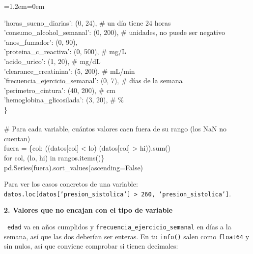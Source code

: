 \documentclass[11pt,a4paper]{article}
\newenvironment{codigo}
  {\par\smallskip\begin{list}{}{\leftmargin=1.2em\rightmargin=0em}\item\relax\ttfamily\scriptsize\raggedright}
  {\end{list}\smallskip}
\begin{document}
{\begin{codigo}
\hspace*{2.08em}'horas\_\allowbreak{}sueno\_\allowbreak{}diarias': (0, 24),        \# un día tiene 24 horas \\{}
\hspace*{2.08em}'consumo\_\allowbreak{}alcohol\_\allowbreak{}semanal': (0, 200),   \# unidades, no puede ser negativo \\{}
\hspace*{2.08em}'anos\_\allowbreak{}fumador': (0, 90), \\{}
\hspace*{2.08em}'proteina\_\allowbreak{}c\_\allowbreak{}reactiva': (0, 500),       \# mg/\allowbreak{}L \\{}
\hspace*{2.08em}'acido\_\allowbreak{}urico': (1, 20),                \# mg/\allowbreak{}dL \\{}
\hspace*{2.08em}'clearance\_\allowbreak{}creatinina': (5, 200),      \# mL/\allowbreak{}min \\{}
\hspace*{2.08em}'frecuencia\_\allowbreak{}ejercicio\_\allowbreak{}semanal': (0, 7),   \# días de la semana \\{}
\hspace*{2.08em}'perimetro\_\allowbreak{}cintura': (40, 200),        \# cm \\{}
\hspace*{2.08em}'hemoglobina\_\allowbreak{}glicosilada': (3, 20),    \# \% \\{}
\} \\{}
\mbox{} \\{}
\# Para cada variable, cuántos valores caen fuera de su rango (los NaN no cuentan) \\{}
fuera = \{col: ((datos[col] \textless{} lo) \textbar{} (datos[col] \textgreater{} hi)).sum() \\{}
\hspace*{4.68em}for col, (lo, hi) in rangos.items()\} \\{}
pd.Series(fuera).sort\_\allowbreak{}values(ascending=False)
\end{codigo}
Para ver los casos concretos de una variable: \texttt{datos.loc[datos['presion\_\allowbreak{}sistolica'] \textgreater{} 260, 'presion\_\allowbreak{}sistolica']}.

\textbf{2. Valores que no encajan con el tipo de variable}

\hspace*{1.0em}\textbullet~\texttt{edad} va en años cumplidos y \texttt{frecuencia\_\allowbreak{}ejercicio\_\allowbreak{}semanal} en días a la semana, así que las dos deberían ser enteras. En tu \texttt{info()} salen como \texttt{float64} y sin nulos, así que conviene comprobar si tienen decimales:

}
\end{document}
